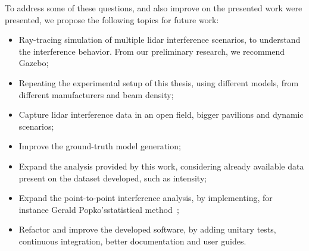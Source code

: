 To address some of these questions, and also improve on the presented work were presented, we propose the following topics for future work:

\begin{itemize}
	\item Ray-tracing simulation of multiple \ac{lidar} interference scenarios, to understand the interference behavior. From our preliminary research, we recommend Gazebo\cp;
	\item Repeating the experimental setup of this thesis, using different models, from different manufacturers and beam density;
	\item Capture \ac{lidar} interference data in an open field, bigger pavilions and dynamic scenarios;
	\item Improve the ground-truth model generation;
	\item Expand the analysis provided by this work, considering already available data present on the dataset developed, such as intensity;
	\item Expand the point-to-point interference analysis, by implementing, for instance Gerald Popko's\etal statistical method~\cite{Popko2019b};
	\item Refactor and improve the developed software, by adding unitary tests, continuous integration, better documentation and user guides.
\end{itemize}



